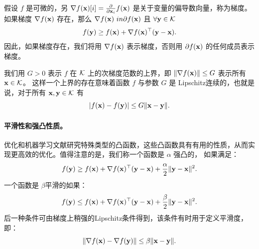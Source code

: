 假设 $f$ 是可微的，另 $\nabla f(\mathbf x) [i]=\frac{\partial}{\partial \mathbf x_i} f(\mathbf x)$ 是关于变量的偏导数向量，称为梯度。
如果梯度 $\nabla f(\mathbf x)$ 存在，那么 $\nabla f(\mathbf x) \ in\partial f(\mathbf x)$ 且 $\forall \mathbf y \in \mathcal K$
$$  f(\mathbf y) \geq f(\mathbf x) + \nabla f(\mathbf x)^\top (\mathbf y-\mathbf x).$$
因此，如果梯度存在，我们将用 $\nabla f(\mathbf x)$ 表示梯度，否则用 $\partial f(\mathbf x)$ 的任何成员表示梯度。 

我们用 $G>0$ 表示 $f$ 在 $\mathcal K$ 上的次梯度范数的上界，即 $\|\nabla f(\mathbf x)\| \leq G$ 表示所有 $\mathbf x\in\mathcal K$。
这样一个上界的存在意味着函数 $f$ 与参数 $G$ 是 Lipschitz连续的，也就是说，对于所有 $\mathbf x, \mathbf y \in \mathcal K$ 有
$$ |f(\mathbf x) - f(\mathbf y)| \leq G \|\mathbf x-\mathbf y\|.$$


\paragraph{
    平滑性和强凸性质。
    }

 优化和机器学习文献研究特殊类型的凸函数，这些凸函数具有有用的性质，从而实现更高效的优化。值得注意的是，我们称一个函数是 $\alpha$ 强凸的， 如果满足：
$$  f(  \mathbf y) \geq  f(\mathbf x) + \nabla f(\mathbf x)^\top (\mathbf y-\mathbf x)  + \frac{\alpha}{2} \|\mathbf y-\mathbf x\|^2.  $$
一个函数是 $\beta$平滑的如果：
$$  f(  \mathbf y) \leq  f(\mathbf x) + \nabla f(\mathbf x)^\top (\mathbf y-\mathbf x)  + \frac{\beta}{2} \|\mathbf y-\mathbf x\|^2.  $$
后一种条件可由梯度上稍强的Lipschitz条件得到，该条件有时用于定义平滑度，即：
$$ \| \nabla f(\mathbf x) - \nabla f(\mathbf y) \| \leq {\beta} \|\mathbf x-\mathbf y\|.$$

